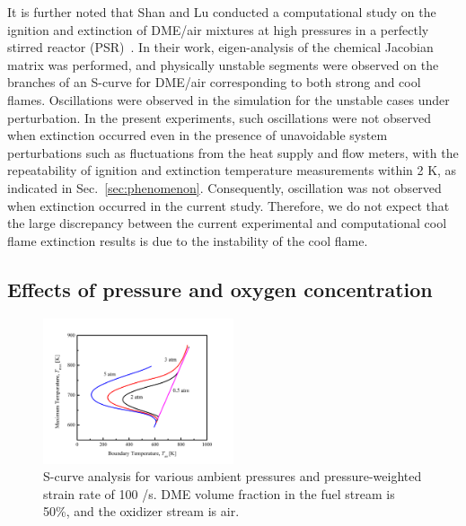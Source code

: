 \documentclass[review,3p,times]{elsarticle}
\begin{document}
\textcolor{Rev2}{It is further noted that Shan and Lu conducted a computational study on the ignition and extinction of DME/air mixtures at high pressures in a perfectly stirred reactor (PSR)~\cite{shan12b}.  In their work, eigen-analysis of the chemical Jacobian matrix was performed, and physically unstable segments were observed on the branches of an S-curve for DME/air corresponding to both strong and cool flames.  Oscillations were observed in the simulation for the unstable cases under perturbation.  In the present experiments, such oscillations were not observed when extinction occurred even in the presence of unavoidable system perturbations such as fluctuations from the heat supply and flow meters, with the repeatability of ignition and extinction temperature measurements within 2 K, as indicated in Sec.~\ref{sec:phenomenon}.  Consequently, oscillation was not observed when extinction occurred in the current study.  Therefore, we do not expect that the large discrepancy between the current experimental and computational cool flame extinction results is due to the instability of the cool flame.}

\subsection{Effects of pressure and oxygen concentration}

\begin{figure}[t]
  \centering
  \scriptsize
  \includegraphics[trim=6.5mm 7.5mm 7mm 8mm, clip=true, width=0.5\textwidth]{eff_P.png}
  \normalsize
  \caption{S-curve analysis for various ambient pressures and pressure-weighted strain rate of 100 /s.  DME volume fraction in the fuel stream is 50\%, and the oxidizer stream is air.}
  \label{fig:eff_P}
\end{figure}
\end{document}
